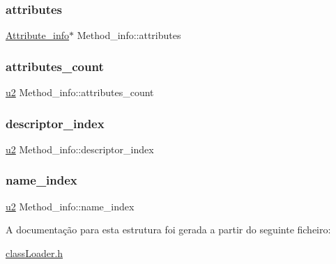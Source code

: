 \mbox{\label{struct_method__info_a56fbb565dcff2992d66f57b29774c322}} 
\subsubsection{\texorpdfstring{attributes}{attributes}}
{\footnotesize\ttfamily \hyperlink{struct_attribute__info}{Attribute\+\_\+info}$\ast$ Method\+\_\+info\+::attributes}

\mbox{\label{struct_method__info_a3d4d1bac8952513abdfa2f3987b11730}} 
\subsubsection{\texorpdfstring{attributes\+\_\+count}{attributes\_count}}
{\footnotesize\ttfamily \hyperlink{util_8h_a55ef8d87fd202b8417704c089899c5b9}{u2} Method\+\_\+info\+::attributes\+\_\+count}

\mbox{\label{struct_method__info_ad3445921db5b20bcd3e5e8aa10d16c3b}} 
\subsubsection{\texorpdfstring{descriptor\+\_\+index}{descriptor\_index}}
{\footnotesize\ttfamily \hyperlink{util_8h_a55ef8d87fd202b8417704c089899c5b9}{u2} Method\+\_\+info\+::descriptor\+\_\+index}

\mbox{\label{struct_method__info_a36cd72ed440f6357ef4c777d56a58cd5}} 
\subsubsection{\texorpdfstring{name\+\_\+index}{name\_index}}
{\footnotesize\ttfamily \hyperlink{util_8h_a55ef8d87fd202b8417704c089899c5b9}{u2} Method\+\_\+info\+::name\+\_\+index}



A documentação para esta estrutura foi gerada a partir do seguinte ficheiro\+:\begin{DoxyCompactItemize}
\item 
\hyperlink{class_loader_8h}{class\+Loader.\+h}\end{DoxyCompactItemize}
